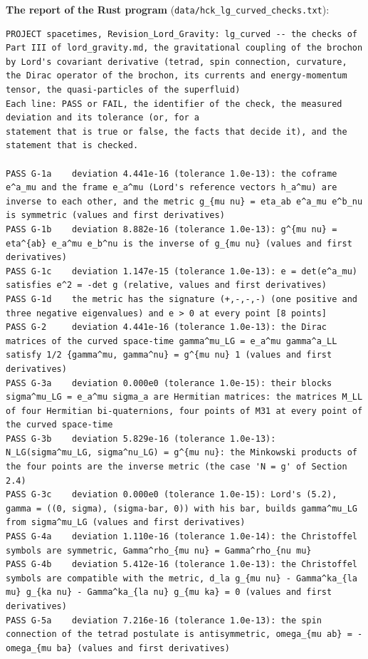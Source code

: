 \documentclass[
  10pt,
]{article}
\begin{document}
\textbf{The report of the Rust program}
(\texttt{data/hck\_lg\_curved\_checks.txt}):

\begin{verbatim}
PROJECT spacetimes, Revision_Lord_Gravity: lg_curved -- the checks of Part III of lord_gravity.md, the gravitational coupling of the brochon by Lord's covariant derivative (tetrad, spin connection, curvature, the Dirac operator of the brochon, its currents and energy-momentum tensor, the quasi-particles of the superfluid)
Each line: PASS or FAIL, the identifier of the check, the measured deviation and its tolerance (or, for a
statement that is true or false, the facts that decide it), and the statement that is checked.

PASS G-1a    deviation 4.441e-16 (tolerance 1.0e-13): the coframe e^a_mu and the frame e_a^mu (Lord's reference vectors h_a^mu) are inverse to each other, and the metric g_{mu nu} = eta_ab e^a_mu e^b_nu is symmetric (values and first derivatives)
PASS G-1b    deviation 8.882e-16 (tolerance 1.0e-13): g^{mu nu} = eta^{ab} e_a^mu e_b^nu is the inverse of g_{mu nu} (values and first derivatives)
PASS G-1c    deviation 1.147e-15 (tolerance 1.0e-13): e = det(e^a_mu) satisfies e^2 = -det g (relative, values and first derivatives)
PASS G-1d    the metric has the signature (+,-,-,-) (one positive and three negative eigenvalues) and e > 0 at every point [8 points]
PASS G-2     deviation 4.441e-16 (tolerance 1.0e-13): the Dirac matrices of the curved space-time gamma^mu_LG = e_a^mu gamma^a_LL satisfy 1/2 {gamma^mu, gamma^nu} = g^{mu nu} 1 (values and first derivatives)
PASS G-3a    deviation 0.000e0 (tolerance 1.0e-15): their blocks sigma^mu_LG = e_a^mu sigma_a are Hermitian matrices: the matrices M_LL of four Hermitian bi-quaternions, four points of M31 at every point of the curved space-time
PASS G-3b    deviation 5.829e-16 (tolerance 1.0e-13): N_LG(sigma^mu_LG, sigma^nu_LG) = g^{mu nu}: the Minkowski products of the four points are the inverse metric (the case 'N = g' of Section 2.4)
PASS G-3c    deviation 0.000e0 (tolerance 1.0e-15): Lord's (5.2), gamma = ((0, sigma), (sigma-bar, 0)) with his bar, builds gamma^mu_LG from sigma^mu_LG (values and first derivatives)
PASS G-4a    deviation 1.110e-16 (tolerance 1.0e-14): the Christoffel symbols are symmetric, Gamma^rho_{mu nu} = Gamma^rho_{nu mu}
PASS G-4b    deviation 5.412e-16 (tolerance 1.0e-13): the Christoffel symbols are compatible with the metric, d_la g_{mu nu} - Gamma^ka_{la mu} g_{ka nu} - Gamma^ka_{la nu} g_{mu ka} = 0 (values and first derivatives)
PASS G-5a    deviation 7.216e-16 (tolerance 1.0e-13): the spin connection of the tetrad postulate is antisymmetric, omega_{mu ab} = -omega_{mu ba} (values and first derivatives)

\end{verbatim}
\end{document}
